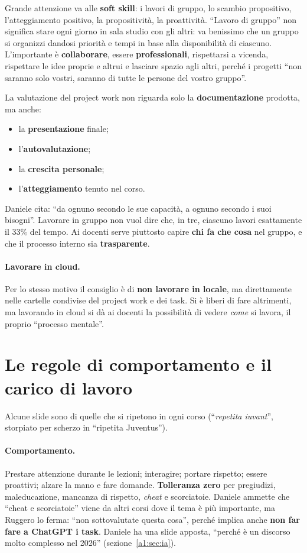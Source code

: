 Grande attenzione va alle \textbf{soft skill}: i lavori di gruppo, lo scambio
propositivo, l'atteggiamento positivo, la propositività, la proattività.
``Lavoro di gruppo'' non significa stare ogni giorno in sala studio con gli
altri: va benissimo che un gruppo si organizzi dandosi priorità e tempi in base
alla disponibilità di ciascuno. L'importante è \textbf{collaborare}, essere
\textbf{professionali}, rispettarsi a vicenda, rispettare le idee proprie e
altrui e lasciare spazio agli altri, perché i progetti ``non saranno solo
vostri, saranno di tutte le persone del vostro gruppo''.

La valutazione del project work non riguarda solo la \textbf{documentazione}
prodotta, ma anche:
\begin{itemize}
  \item la \textbf{presentazione} finale;
  \item l'\textbf{autovalutazione};
  \item la \textbf{crescita personale};
  \item l'\textbf{atteggiamento} tenuto nel corso.
\end{itemize}
Daniele cita: ``da ognuno secondo le sue capacità, a ognuno secondo i suoi
bisogni''. Lavorare in gruppo non vuol dire che, in tre, ciascuno lavori
esattamente il 33\% del tempo. Ai docenti serve piuttosto capire \textbf{chi fa
che cosa} nel gruppo, e che il processo interno sia \textbf{trasparente}.

\paragraph{Lavorare in cloud.} Per lo stesso motivo il consiglio è di
\textbf{non lavorare in locale}, ma direttamente nelle cartelle condivise del
project work e dei task. Si è liberi di fare altrimenti, ma lavorando in cloud
si dà ai docenti la possibilità di vedere \emph{come} si lavora, il proprio
``processo mentale''.

\section{Le regole di comportamento e il carico di lavoro}
\label{a1:sec:regole}

Alcune slide sono di quelle che si ripetono in ogni corso (``\emph{repetita
iuvant}'', storpiato per scherzo in ``ripetita Juventus'').

\paragraph{Comportamento.} Prestare attenzione durante le lezioni; interagire;
portare rispetto; essere proattivi; alzare la mano e fare domande.
\textbf{Tolleranza zero} per pregiudizi, maleducazione, mancanza di rispetto,
\emph{cheat} e scorciatoie. Daniele ammette che ``cheat e scorciatoie'' viene da
altri corsi dove il tema è più importante, ma Ruggero lo ferma: ``non
sottovalutate questa cosa'', perché implica anche \textbf{non far fare a ChatGPT
i task}. Daniele ha una slide apposta, ``perché è un discorso molto complesso nel
2026'' (sezione~\ref{a1:sec:ia}).

